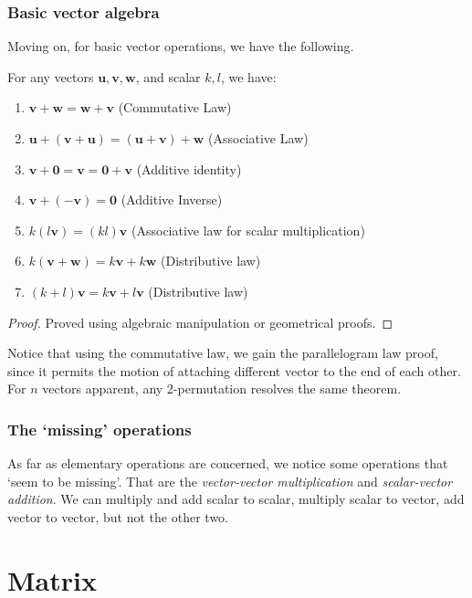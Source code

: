 \subsubsection{Basic vector algebra}
Moving on, for basic vector operations, we have the following. 
\begin{theorem}
    For any vectors $\mathbf{u},\mathbf{v},\mathbf{w}$, and scalar $k,l$, we have: 
    \begin{enumerate}[topsep=0.5pt,itemsep=1pt,label=(\emph{\alph*})]
        \item $\mathbf{v}+\mathbf{w}=\mathbf{w}+\mathbf{v}$ (Commutative Law)
        \item $\mathbf{u}+(\mathbf{v}+\mathbf{u})=(\mathbf{u}+\mathbf{v})+\mathbf{w}$ (Associative Law)
        \item $\mathbf{v}+\mathbf{0}=\mathbf{v}=\mathbf{0}+\mathbf{v}$ (Additive identity)
        \item $\mathbf{v}+(-\mathbf{v})=\mathbf{0}$ (Additive Inverse)
        \item $k(l\mathbf{v})=(kl)\mathbf{v}$ (Associative law for scalar multiplication)
        \item $k(\mathbf{v}+\mathbf{w})=k\mathbf{v}+k\mathbf{w}$ (Distributive law)
        \item $(k+l)\mathbf{v}=k\mathbf{v}+l\mathbf{v}$ (Distributive law)
    \end{enumerate}
\end{theorem}
\begin{proof}
    Proved using algebraic manipulation or geometrical proofs. 
\end{proof}
Notice that using the commutative law, we gain the parallelogram law proof, since it permits the motion of attaching different vector to the end of each other. For $n$ vectors apparent, any 2-permutation resolves the same theorem. 
\subsubsection{The `missing' operations}
As far as elementary operations are concerned, we notice some operations that `seem to be missing'. That are the \textit{vector-vector multiplication} and \textit{scalar-vector addition}. We can multiply and add scalar to scalar, multiply scalar to vector, add vector to vector, but not the other two. 

\section{Matrix}

